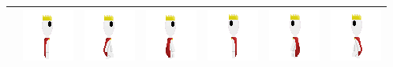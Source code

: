 \documentclass[../Main.tex]{subfiles}
\begin{document}
\begin{center}
\begin{tabular}{ | m{} | m{} m{} m{} m{} m{} m{} | }
                    & \centerline{\includegraphics[scale=3]{../res/textures/entities/player/heir/East.png}} & \centerline{\includegraphics[scale=3]{../res/textures/entities/player/heir/East-Walk-1.png}} & \centerline{\includegraphics[scale=3]{../res/textures/entities/player/heir/East-Walk-2.png}} & \centerline{\includegraphics[scale=3]{../res/textures/entities/player/heir/West.png}} & \centerline{\includegraphics[scale=3]{../res/textures/entities/player/heir/West-Walk-1.png}} & \centerline{\includegraphics[scale=3]{../res/textures/entities/player/heir/West-Walk-2.png}} \\
                    \hline

\end{tabular}
\end{center}
\end{document}

